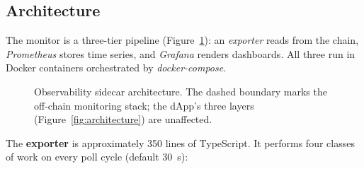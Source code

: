 \subsection{Architecture}
\label{subsection:4.7.2}

The monitor is a three-tier pipeline (Figure~\ref{fig:observability_arch}): an \emph{exporter} reads from the chain, \emph{Prometheus} stores time series, and \emph{Grafana} renders dashboards. All three run in Docker containers orchestrated by \emph{docker-compose}.

%
\begin{figure}[H]
    \centering
    \caption{Observability sidecar architecture. The dashed boundary marks the off-chain monitoring stack; the dApp's three layers (Figure~\ref{fig:architecture}) are unaffected.}
    \label{fig:observability_arch}
\end{figure}

The \textbf{exporter} is approximately 350 lines of TypeScript. It performs four classes of work on every poll cycle (default 30~s):

